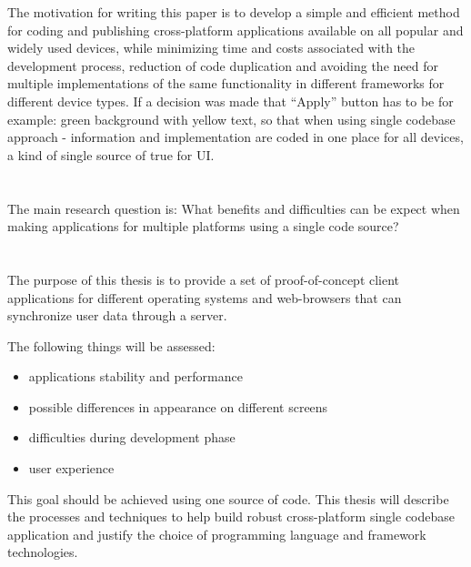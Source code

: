 The motivation for writing this paper is to develop a simple and efficient method for coding and publishing cross-platform applications available on all popular and widely used devices, while minimizing time and costs associated with the development process, reduction of code duplication and avoiding the need for multiple implementations of the same functionality in different frameworks for different device types. If a decision was made that “Apply” button has to be for example: green background with yellow text, so that when using single codebase approach - information and implementation are coded in one place for all devices, a kind of single source of true for UI.


\section{}%
\label{sec:onderzoeksvraag}


The main research question is:  What benefits and difficulties can be expect when making applications for multiple platforms using a single code source?

\section{}%
\label{sec:onderzoeksdoelstelling}


The purpose of this thesis is to provide a set of proof-of-concept client applications for different operating systems and web-browsers that can synchronize user data through a server. 

The following things will be assessed:
\begin{itemize}
    \item  applications stability and performance
    \item  possible differences in appearance on different screens
    \item  difficulties during development phase
    \item  user experience
\end{itemize}
This goal should be achieved using one source of code. This thesis will describe the processes and techniques to help build robust cross-platform single codebase application and justify the choice of programming language and framework technologies.


